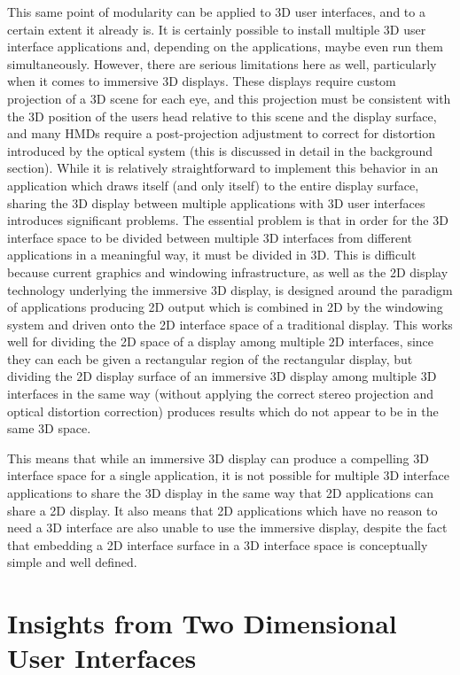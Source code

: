 This same point of modularity can be applied to 3D user interfaces, and to a certain extent it already is. It is certainly possible to install multiple 3D user interface applications and, depending on the applications, maybe even run them simultaneously. However, there are serious limitations here as well, particularly when it comes to immersive 3D displays. These displays require custom projection of a 3D scene for each eye, and this projection must be consistent with the 3D position of the users head relative to this scene and the display surface, and many HMDs require a post-projection adjustment to correct for distortion introduced by the optical system (this is discussed in detail in the background section). While it is relatively straightforward to implement this behavior in an application which draws itself (and only itself) to the entire display surface, sharing the 3D display between multiple applications with 3D user interfaces introduces significant problems.
The essential problem is that in order for the 3D interface space to be divided between multiple 3D interfaces from different applications in a meaningful way, it must be divided in 3D. This is difficult because current graphics and windowing infrastructure, as well as the 2D display technology underlying the immersive 3D display, is designed around the paradigm of applications producing 2D output which is combined in 2D by the windowing system and driven onto the 2D interface space of a traditional display. This works well for dividing the 2D space of a display among multiple 2D interfaces, since they can each be given a rectangular region of the rectangular display, but dividing the 2D display surface of an immersive 3D display among multiple 3D interfaces in the same way (without applying the correct stereo projection and optical distortion correction) produces results which do not appear to be in the same 3D space. 

This means that while an immersive 3D display can produce a compelling 3D interface space for a single application, it is not possible for multiple 3D interface applications to share the 3D display in the same way that 2D applications can share a 2D display. It also means that 2D applications which have no reason to need a 3D interface are also unable to use the immersive display, despite the fact that embedding a 2D interface surface in a 3D interface space is conceptually simple and well defined.

\section{Insights from Two Dimensional User Interfaces}

